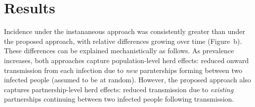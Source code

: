 \section{Results}
Incidence under the instananeous approach was
consistently greater than under the proposed approach,
with relative differences growing over time (Figure~b).
These differences can be explained mechanistically as follows.
As prevalence increases, both approaches capture population-level herd effects:
reduced onward transmission from each infection due to
\emph{new} parnterships forming between two infected people (assumed to be at random).
However, the proposed approach also captures partnership-level herd effects:
reduced transmission due to \emph{existing} partnerships
continuing between two infected people following transmission.
